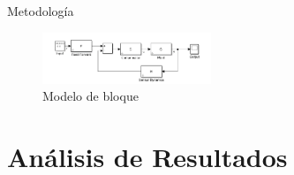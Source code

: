 \documentclass[mathserif,spanish]{beamer}
\begin{document}
    
        \begin{frame}{Metodología}
               \item 
                 
        \begin{figure}[!h]
\centering
\includegraphics[width=0.45\textwidth]{img06.png}
\caption{Modelo de bloque  }
\label{fig:rlocus1}
\end{figure}
        
       \end{frame}










\section{Análisis de Resultados}   %
\end{document}
